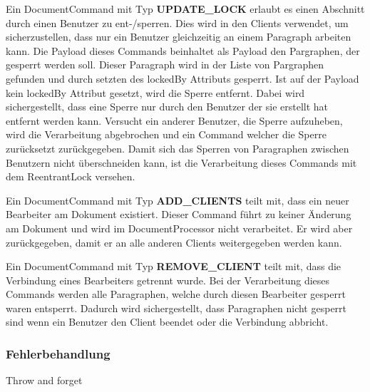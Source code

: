 Ein DocumentCommand mit Typ \textbf{UPDATE\_LOCK} erlaubt es einen Abschnitt durch einen Benutzer zu ent-/sperren.
Dies wird in den Clients verwendet, um sicherzustellen, dass nur ein Benutzer gleichzeitig an einem Paragraph arbeiten kann.
Die Payload dieses Commands beinhaltet als Payload den Pargraphen, der gesperrt werden soll.
Dieser Paragraph wird in der Liste von Pargraphen gefunden und durch setzten des lockedBy Attributs gesperrt.
Ist auf der Payload kein lockedBy Attribut gesetzt, wird die Sperre entfernt.
Dabei wird sichergestellt, dass eine Sperre nur durch den Benutzer der sie erstellt hat entfernt werden kann.
Versucht ein anderer Benutzer, die Sperre aufzuheben, wird die Verarbeitung abgebrochen und ein Command welcher die Sperre zurücksetzt zurückgegeben.
Damit sich das Sperren von Paragraphen zwischen Benutzern nicht überschneiden kann, ist die Verarbeitung dieses Commands mit dem ReentrantLock versehen. 

Ein DocumentCommand mit Typ \textbf{ADD\_CLIENTS} teilt mit, dass ein neuer Bearbeiter am Dokument existiert.
Dieser Command führt zu keiner Änderung am Dokument und wird im DocumentProcessor nicht verarbeitet.
Er wird aber zurückgegeben, damit er an alle anderen Clients weitergegeben werden kann.

Ein DocumentCommand mit Typ \textbf{REMOVE\_CLIENT} teilt mit, dass die Verbindung eines Bearbeiters getrennt wurde.
Bei der Verarbeitung dieses Commands werden alle Paragraphen, welche durch diesen Bearbeiter gesperrt waren entsperrt.
Dadurch wird sichergestellt, dass Paragraphen nicht gesperrt sind wenn ein Benutzer den Client beendet oder die Verbindung abbricht.

\clearpage

\subsubsection{Fehlerbehandlung}

Throw and forget

\clearpage
